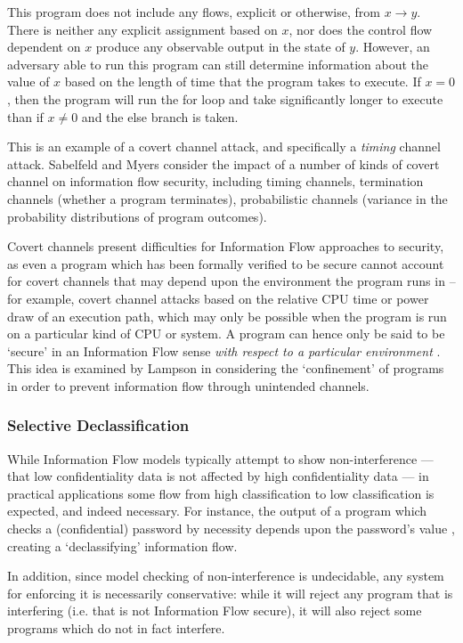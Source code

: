 This program does not include any flows, explicit or otherwise, from $ x \rightarrow y $. There is neither any explicit assignment based on $ x $, nor does the control flow dependent on $ x $ produce any observable output in the state of $ y $. However, an adversary able to run this program can still determine information about the value of $ x $ based on the length of time that the program takes to execute. If $ x = 0 $, then the program will run the for loop and take significantly longer to execute than if $ x \ne 0 $ and the else branch is taken.

This is an example of a covert channel attack, and specifically a \textit{timing} channel attack. Sabelfeld and Myers \cite{sabelfeld2003if} consider the impact of a number of kinds of covert channel on information flow security, including timing channels, termination channels (whether a program terminates), probabilistic channels (variance in the probability distributions of program outcomes).

Covert channels present difficulties for Information Flow approaches to security, as even a program which has been formally verified to be secure cannot account for covert channels that may depend upon the environment the program runs in -- for example, covert channel attacks based on the relative CPU time or power draw of an execution path, which may only be possible when the program is run on a particular kind of CPU or system. A program can hence only be said to be `secure' in an Information Flow sense \textit{with respect to a particular environment} \cite{sabelfeld2003if}. This idea is examined by Lampson \cite{lampson1973covertchannels} in considering the `confinement' of programs in order to prevent information flow through unintended channels.	

\subsubsection{Selective Declassification}

While Information Flow models typically attempt to show non-interference --- that low confidentiality data is not affected by high confidentiality data --- in practical applications some flow from high classification to low classification is expected, and indeed necessary. For instance, the output of a program which checks a (confidential) password by necessity depends upon the password's value \cite{sabelfeld2003if}, creating a `declassifying' information flow.

In addition, since model checking of non-interference is undecidable, any system for enforcing it is necessarily conservative: while it will reject any program that is interfering (i.e. that is not Information Flow secure), it will also reject some programs which do not in fact interfere.

